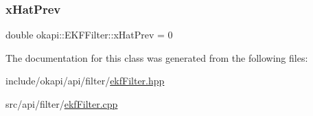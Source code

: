 \mbox{\label{classokapi_1_1EKFFilter_a849990196023b1386d56cae56ac3940b}} 
\subsubsection{\texorpdfstring{xHatPrev}{xHatPrev}}
{\footnotesize\ttfamily double okapi\+::\+E\+K\+F\+Filter\+::x\+Hat\+Prev = 0\hspace{0.3cm}{\ttfamily [protected]}}



The documentation for this class was generated from the following files\+:\begin{DoxyCompactItemize}
\item 
include/okapi/api/filter/\mbox{\hyperlink{ekfFilter_8hpp}{ekf\+Filter.\+hpp}}\item 
src/api/filter/\mbox{\hyperlink{ekfFilter_8cpp}{ekf\+Filter.\+cpp}}\end{DoxyCompactItemize}
